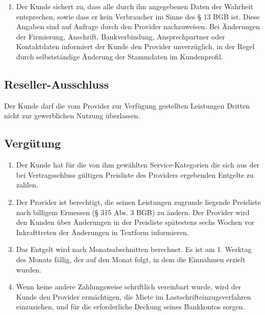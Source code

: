 \documentclass{terms}
\begin{document}
\begin{enumerate}
\item Der Kunde sichert zu, dass alle durch ihn angegebenen Daten der Wahrheit entsprechen, sowie dass er kein Verbraucher im Sinne des § 13 BGB ist. Diese Angaben sind auf Anfrage durch den Provider nachzuweisen. Bei Änderungen der Firmierung, Anschrift, Bankverbindung, Ansprechpartner oder Kontaktdaten informiert der Kunde den Provider unverzüglich, in der Regel durch selbstständige Änderung der Stammdaten im Kundenprofil.
\end{enumerate}


\subsection{Reseller-Ausschluss}

Der Kunde darf die vom Provider zur Verfügung gestellten Leistungen Dritten nicht zur gewerblichen Nutzung überlassen.

\subsection{Vergütung}
\begin{enumerate}
\item Der Kunde hat für die von ihm gewählten Service-Kategorien die sich aus der bei Vertragsschluss gültigen Preisliste des Providers ergebenden Entgelte zu zahlen.
\item Der Provider ist berechtigt, die seinen Leistungen zugrunde liegende Preisliste nach billigem Ermessen (§ 315 Abs. 3 BGB) zu ändern. Der Provider wird den Kunden über Änderungen in der Preisliste spätestens sechs Wochen vor Inkrafttreten der Änderungen in Textform informieren.
\item Das Entgelt wird nach Monatsabschnitten berechnet. Es ist am 1. Werktag des Monats fällig, der auf den Monat folgt, in dem die Einnahmen erzielt wurden.
\item Wenn keine andere Zahlungsweise schriftlich vereinbart wurde, wird der Kunde den Provider ermächtigen, die Miete im Lastschrifteinzugsverfahren einzuziehen, und für die erforderliche Deckung seines Bankkontos sorgen.
\end{enumerate}
\end{document}
